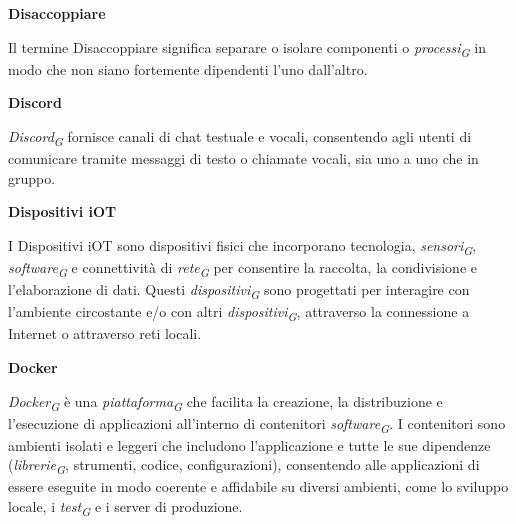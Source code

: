 \documentclass{article}
\begin{document}
\vspace{0.4cm}

\textbf{Disaccoppiare}

\vspace{0.1cm}

Il termine Disaccoppiare significa separare o isolare componenti o \textit{processi}\textsubscript{\textit{G}} in modo che non siano fortemente dipendenti l'uno dall'altro.

\vspace{0.4cm}

\textbf{Discord}

\vspace{0.1cm}

\textit{Discord}\textsubscript{\textit{G}} fornisce canali di chat testuale e vocali, consentendo agli utenti di comunicare tramite messaggi di testo o chiamate vocali, sia uno a uno che in gruppo.

\vspace{0.4cm}

\textbf{Dispositivi iOT}

\vspace{0.1cm}

I Dispositivi iOT sono dispositivi fisici che incorporano tecnologia, \textit{sensori}\textsubscript{\textit{G}}, \textit{software}\textsubscript{\textit{G}} e connettività di \textit{rete}\textsubscript{\textit{G}} per consentire la raccolta, la condivisione e l'elaborazione di dati. Questi \textit{dispositivi}\textsubscript{\textit{G}} sono progettati per interagire con l'ambiente circostante e/o con altri \textit{dispositivi}\textsubscript{\textit{G}}, attraverso la connessione a Internet o attraverso reti locali.

\vspace{0.4cm}

\textbf{Docker}

\vspace{0.1cm}

\textit{Docker}\textsubscript{\textit{G}} è una \textit{piattaforma}\textsubscript{\textit{G}} che facilita la creazione, la distribuzione e l'esecuzione di applicazioni all'interno di contenitori \textit{software}\textsubscript{\textit{G}}. I contenitori sono ambienti isolati e leggeri che includono l'applicazione e tutte le sue dipendenze (\textit{librerie}\textsubscript{\textit{G}}, strumenti, codice, configurazioni), consentendo alle applicazioni di essere eseguite in modo coerente e affidabile su diversi ambienti, come lo sviluppo locale, i \textit{test}\textsubscript{\textit{G}} e i server di produzione.
\end{document}
